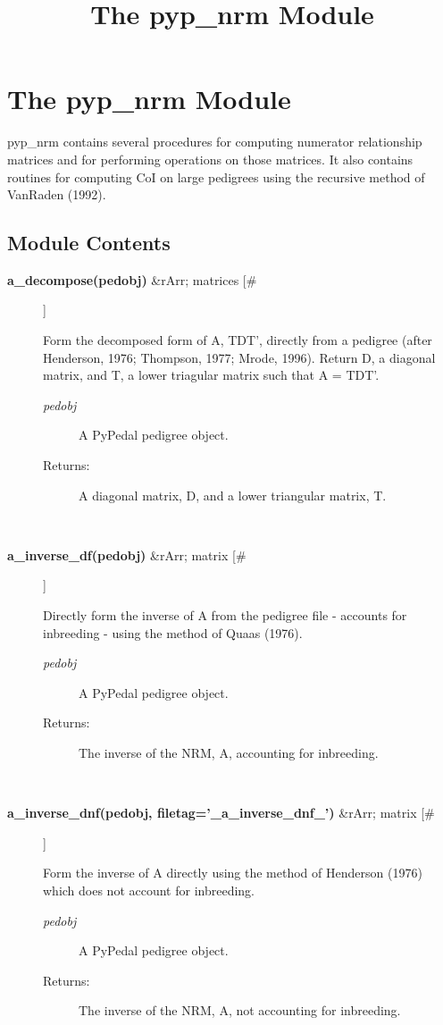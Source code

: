 \documentclass[10pt]{article}
\title{The pyp\_nrm Module}
\begin{document}
\section*{The pyp\_nrm Module}


 pyp\_nrm contains several procedures for computing numerator relationship matrices and for performing operations on those matrices. It also contains routines for computing CoI on large pedigrees using the recursive method of VanRaden (1992).
\subsection*{Module Contents}
\begin{description}
\item[\textbf{a\_decompose(pedobj)}
 \&rArr; matrices [\#]]

 Form the decomposed form of A, TDT', directly from a pedigree (after Henderson, 1976; Thompson, 1977; Mrode, 1996). Return D, a diagonal matrix, and T, a lower triagular matrix such that A = TDT'.
\begin{description}
\item[\emph{pedobj}
] A PyPedal pedigree object.
\item[Returns:] A diagonal matrix, D, and a lower triangular matrix, T.

\end{description}
\\ 

\item[\textbf{a\_inverse\_df(pedobj)}
 \&rArr; matrix [\#]]

 Directly form the inverse of A from the pedigree file - accounts for inbreeding - using the method of Quaas (1976).
\begin{description}
\item[\emph{pedobj}
] A PyPedal pedigree object.
\item[Returns:] The inverse of the NRM, A, accounting for inbreeding.

\end{description}
\\ 

\item[\textbf{a\_inverse\_dnf(pedobj, filetag='\_a\_inverse\_dnf\_')}
 \&rArr; matrix [\#]]

 Form the inverse of A directly using the method of Henderson (1976) which does not account for inbreeding.
\begin{description}
\item[\emph{pedobj}
] A PyPedal pedigree object.
\item[Returns:] The inverse of the NRM, A, not accounting for inbreeding.


\end{description}
\end{description}
\end{document}
